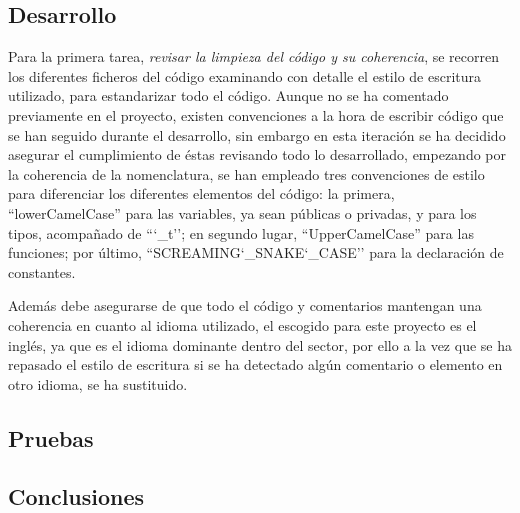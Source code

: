     \subsection{Desarrollo}
    
        Para la primera tarea, \textit{revisar la limpieza del código y su coherencia}, se recorren los diferentes ficheros del código examinando con detalle el estilo de escritura utilizado, para estandarizar todo el código. Aunque no se ha comentado previamente en el proyecto, existen convenciones a la hora de escribir código que se han seguido durante el desarrollo, sin embargo en esta iteración se ha decidido asegurar el cumplimiento de éstas revisando todo lo desarrollado, empezando por la coherencia de la nomenclatura, se han empleado tres convenciones de estilo para diferenciar los diferentes elementos del código: la primera,  ``lowerCamelCase'' para las variables, ya sean públicas o privadas, y para los tipos, acompañado de ``\char`_t''; en segundo lugar, ``UpperCamelCase'' para las funciones; por último,  ``SCREAMING\char`_SNAKE\char`_CASE'' para la declaración de constantes.
        
        Además debe asegurarse de que todo el código y comentarios mantengan una coherencia en cuanto al idioma utilizado, el escogido para este proyecto es el inglés, ya que es el idioma dominante dentro del sector, por ello a la vez que se ha repasado el estilo de escritura si se ha detectado algún comentario o elemento en otro idioma, se ha sustituido.
    \subsection{Pruebas}
    \subsection{Conclusiones}